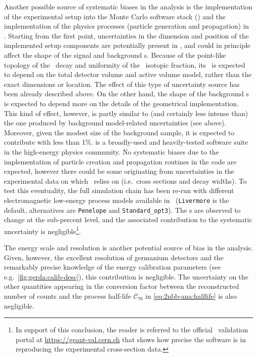 \begin{description}[wide]
  \item[\mage\ and \geant{}] Another possible source of systematic biases in the analysis
    is the implementation of the experimental setup into the Monte Carlo software stack
    (\mage) and the implementation of the physics processes (particle generation and
    propagation) in \geant. Starting from the first point, uncertainties in the dimension
    and position of the implemented setup components are potentially present in \mage, and
    could in principle affect the shape of the signal and background \pdf{}s. Because of the
    point-like topology of the \nnbb\ decay and uniformity of the \gesix\ isotopic
    fraction, its \pdf\ is expected to depend on the total detector volume and active volume
    model, rather than the exact dimensions or location. The effect of this type of
    uncertainty source has been already described above. On the other hand, the shape
    of the background \pdf{}s is expected to depend more on the details of the geometrical
    implementation. This kind of effect, however, is partly similar to (and certainly less
    intense than) the one produced by background model-related uncertainties (see above).
    Moreover, given the modest size of the background sample, it is expected to contribute
    with less than 1\%.
    \newpar
    \geant{} is a broadly-used and heavily-tested software suite in the high-energy
    physics community. No systematic biases due to the implementation of particle creation
    and propagation routines in the code are expected, however there could be some
    originating from uncertainties in the experimental data on which \geant\ relies on
    (i.e.~cross sections and decay widths). To test this eventuality, the full simulation
    chain has been re-run with different electromagnetic low-energy process models
    available in \geant\ (\texttt{Livermore} is the default, alternatives are
    \texttt{Penelope} and \texttt{Standard\_opt3}). The \pdf{}s are observed to change at the
    sub-percent level, and the associated contribution to the systematic uncertainty is
    negligible\footnote{%
      In support of this conclusion, the reader is referred to the official \geant\
      validation portal at \url{https://geant-val.cern.ch} that shows how precise the
      software is in reproducing the experimental cross-section data. 
    }.

  \item[Other sources] The energy scale and resolution is another potential source of
    bias in the analysis. Given, however, the excellent resolution of germanium detectors
    and the remarkably precise knowledge of the energy calibration parameters (see
    e.g.~\cref{fig:gerda:calib-desc}), this contribution is negligible. The uncertainty on
    the other quantities appearing in the conversion factor between the reconstructed
    number of counts and the process half-life $\mathcal{C}_{76}$ in
    \cref{eq:2nbb-ana:halflife} is also negligible.

\end{description}


